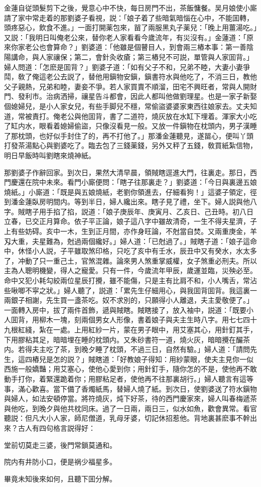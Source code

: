 金蓮自従頭髮剪下之後，覺意心中不快，每日房門不出，茶飯慵餐。吴月娘使小廝請了家中常走着的那劉婆子看視，説：「娘子着了些暗氣暗惱在心中，不能囬轉，頭疼惡心，飲食不進。」一面打開薬包來，㽞了兩服黑丸子薬兒：「晚上用薑湯吃。」又説：「我明日叫俺老公來，替你老人家看看今歲流年，有災沒有。」金蓮道：「原來你家老公也會算命？」劉婆道：「他雖是個瞽目人，到會兩三樁本事：第一善陰陽講命，與人家禳保；第二，會針灸收瘡；第三樁兒不可説，單管與人家囬背。」婦人問道：「怎麽是囬背？」劉婆子道：「如有父子不和，兄弟不睦，大妻小妻爭鬦，敎了俺這老公去説了，替他用鎭物安鎭，鎭書符水與他吃了，不消三日，教他父子親熱，兄弟和睦，妻妾不爭。若人家買賣不順溜，田宅不興旺者，常與人開財門、發利市。治病洒掃，禳星告斗都會，因此人都叫他做劉理星。也是一家子新娶個媳婦兒，是小人家女兒，有些手脚兒不穩，常偷盜婆婆家東西往娘家去。丈夫知道，常被責打。俺老公與他囬背，書了二道符，燒灰放在水缸下埋着。渾家大小吃了缸内水，眼看着媳婦偷盜，只像沒看見一般。又放一件鎭物在枕頭内，男子漢睡了那枕頭，也好似手封住了的，再不打他了。」那潘金蓮聽見，遂㽞心，便叫丫頭打發茶湯點心與劉婆吃了。臨去包了三錢薬錢，另外又秤了五錢，敎買紙紮信物，明日早飯時叫劉瞎來燒神紙。

那劉婆子作辭回家。到次日，果然大清早晨，領賊瞎逕進大門，往裏走。那日，西門慶還在院中未來。看門小廝便問：「瞎子往那裏走？」劉婆道：「今日與裏邊五娘燒紙。」小廝道：「既是與五娘燒紙，老劉你領進去，仔細看狗！」這婆子領定，徑到潘金蓮臥房明間内。等到半日，婦人纔出來。瞎子見了禮，坐下。婦人説與他八字。賊瞎子用手掐了掐，説道：「娘子庚辰年、庚寅月、乙亥日、己丑時。初八日立春，已交正月算命。依子平正論，娘子這八字中雖故清奇，一生不得夫星濟，子上有些妨碍。亥中一木，生到正月間，亦作身旺論，不尅當自焚。又兩重庚金，羊刄大重，夫星難為，尅過兩個纔好。」婦人道：「已尅過了。」賊瞎子道：「娘子這命中，休怪小人説，子平雖取煞印格，只吃了亥中有壬水，辰丑中又有癸水，水太多了，冲動了只一重己土，官煞混雜。論來男人煞重掌威權，女子煞重必刑夫。所以主為人聰明機變，得人之寵愛。只有一件，今歲流年甲辰，歲運並臨，災殃必至。命中又犯小耗勾絞兩位星辰打攪，雖不能傷，只是主有比肩不和，小人嘴舌，常沾些啾唧不寜之狀。」婦人聽了，説道：「累先生仔細用心，與我囬背囬背。我這裏一兩銀子相謝，先生買一盞茶吃。奴不求別的，只願得小人離退，夫主愛敬便了。」一面轉入房中，拔了兩件首飾，遞與賊瞎。賊瞎接了，放入袖中，説道：「既要小人囬背，用柳木一塊，刻兩個男女人形像，書着娘子與夫主生時八字。用七七四十九根紅綫，紮在一處。上用紅紗一片，蒙在男子眼中，用艾塞其心，用針釘其手，下用膠粘其足，暗暗埋在睡的枕頭内。又朱砂書符一道，燒火灰，暗暗攪在釅茶内。若得夫主吃了茶，到晚夕睡了枕頭，不過三日，自然有驗。」婦人道：「請問先生，這四樁兒是怎的説？」賊瞎道：「好教娘子得知：用紗蒙眼，使夫主見你一似西施一般嬌豔；用艾塞心，使他心愛到你；用針釘手，隨你怎的不是，使他再不敢動手打你，着緊還跪着你；用膠粘足者，使他再不往那裏胡行。」婦人聽言有這等事，滿心歡喜。當下備了香燭紙馬，替婦人燒了紙。到次日，使劉婆送了符水鎭物與婦人，如法安頓停當。將符燒灰，炖下好茶，待的西門慶家來，婦人叫春梅遞茶與他吃，到晚夕與他共枕同床。過了一日兩，兩日三，似水如魚，歡會異常。看官聽説：但凡大小人家，師尼僧道，乳母牙婆，切記休招惹他。背地裏甚麽事不幹出來？古人有四句格言説得好：

\begin{myquote}
堂前切莫走三婆，後門常鎖莫通和。

院内有井防小口，便是祸少福星多。
\end{myquote}

畢竟未知後來如何，且聽下囬分解。

